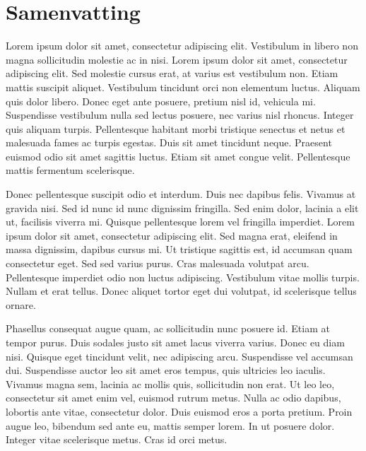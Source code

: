 \chapter{Samenvatting}
\label{samenvatting}



\pagestyle{default}
\normalsize

Lorem ipsum dolor sit amet, consectetur adipiscing elit. Vestibulum in libero non magna sollicitudin molestie ac in nisi. Lorem ipsum dolor sit amet, consectetur adipiscing elit. Sed molestie cursus erat, at varius est vestibulum non. Etiam mattis suscipit aliquet. Vestibulum tincidunt orci non elementum luctus. Aliquam quis dolor libero. Donec eget ante posuere, pretium nisl id, vehicula mi. Suspendisse vestibulum nulla sed lectus posuere, nec varius nisl rhoncus. Integer quis aliquam turpis. Pellentesque habitant morbi tristique senectus et netus et malesuada fames ac turpis egestas. Duis sit amet tincidunt neque. Praesent euismod odio sit amet sagittis luctus. Etiam sit amet congue velit. Pellentesque mattis fermentum scelerisque.

Donec pellentesque suscipit odio et interdum. Duis nec dapibus felis. Vivamus at gravida nisi. Sed id nunc id nunc dignissim fringilla. Sed enim dolor, lacinia a elit ut, facilisis viverra mi. Quisque pellentesque lorem vel fringilla imperdiet. Lorem ipsum dolor sit amet, consectetur adipiscing elit. Sed magna erat, eleifend in massa dignissim, dapibus cursus mi. Ut tristique sagittis est, id accumsan quam consectetur eget. Sed sed varius purus. Cras malesuada volutpat arcu. Pellentesque imperdiet odio non luctus adipiscing. Vestibulum vitae mollis turpis. Nullam et erat tellus. Donec aliquet tortor eget dui volutpat, id scelerisque tellus ornare.

Phasellus consequat augue quam, ac sollicitudin nunc posuere id. Etiam at tempor purus. Duis sodales justo sit amet lacus viverra varius. Donec eu diam nisi. Quisque eget tincidunt velit, nec adipiscing arcu. Suspendisse vel accumsan dui. Suspendisse auctor leo sit amet eros tempus, quis ultricies leo iaculis. Vivamus magna sem, lacinia ac mollis quis, sollicitudin non erat. Ut leo leo, consectetur sit amet enim vel, euismod rutrum metus. Nulla ac odio dapibus, lobortis ante vitae, consectetur dolor. Duis euismod eros a porta pretium. Proin augue leo, bibendum sed ante eu, mattis semper lorem. In ut posuere dolor. Integer vitae scelerisque metus. Cras id orci metus.

